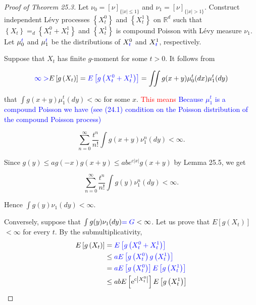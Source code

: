 \documentclass[a4paper,11pt]{article}
\begin{document}
\begin{proof}[Proof of Theorem 25.3]

    Let $\nu_{0}=[\nu]_{\{|x| \leq 1\}}$ and $\nu_{1}=[\nu]_{\{|x|>1\}}$. Construct
    independent Lévy processes $\left\{X_{t}^{0}\right\}$ and $\left\{X_{t}^{1}\right\}$ on $\mathbb{R}^{d}$ such
    that $\left\{X_{t}\right\} =_{d} \left\{X_{t}^{0}+ X_{t}^{1}\right\}$ and
    $\left\{X_{t}^{1}\right\}$ is compound Poisson with Lévy measure $\nu_{1}$. Let $\mu_{0}^{\textcolor{blue}{t}}$ and $\mu_{1}^{\textcolor{blue}{t}}$ be
    the distributions of $X_{\textcolor{blue}{t}}^{0}$ and $X_{\textcolor{blue}{t}}^{1}$, respectively.

    Suppose that $X_{t}$ has finite $g$-moment for some $t>0$. It follows from

    $$
        \textcolor{blue}{\infty>}E\left[g\left(X_{t}\right)\right]
        = \textcolor{blue}{ E\left[g\left(X^{0}_{t} + X^{1}_{t}\right)\right]}
        = \iint g(x+y) \mu_{0}^{t}(dx) \mu_{1}^{t}(dy)
    $$

    that $\int g(x+y) \mu_{1}^{t}(dy)<\infty$ for some $x$. \textcolor{red}{This means}  \textcolor{blue}{ Because $\mu_{1}^{t}$ is a compound Poisson we have (see (24.1) condition on the Poisson distribution of the compound Poisson process)}

    $$
        \sum_{n=0}^{\infty} \frac{t^{n}}{n !} \int g(x+y) \nu_{1}^{n}(dy)<\infty.
    $$

    Since $g(y) \leq a g(-x) g(x+y) \leq a b e^{c|x|} g(x+y)$ by Lemma 25.5, we get


    \begin{equation*}
        \sum_{n=0}^{\infty} \frac{t^{n}}{n !} \int g(y) \nu_{1}^{n}(dy)<\infty. \tag{25.4}
    \end{equation*}

    Hence $\int g(y) \nu_{1}(d y)<\infty$.

    Conversely, suppose that $\int g(y) \nu_{1}(dy) \textcolor{blue}{= G}<\infty$. Let us prove
    that $E\left[g\left(X_{t}\right)\right]$ $<\infty$ for every $t$. By the submultiplicativity,
    \begin{align*}
        E\left[g\left(X_{t}\right)\right] & =  \textcolor{blue}{E\left[g\left(X_{t}^{0} + X_{t}^{1}\right)\right]}                                    \\
                                          & \leq \textcolor{blue}{aE\left[ g\left(X_{t}^{0}\right) g\left(X_{t}^{1}\right)\right]}                    \\
                                          & = \textcolor{blue}{aE\left[ g\left(X_{t}^{0}\right)\right]  E\left[ g\left(X_{t}^{1}\right)\right]}       \\
                                          & \le a b E\left[\mathrm{e}^{\mathrm{c}\left|X_{t}^{0}\right|}\right] E\left[g\left(X_{t}^{1}\right)\right]
    \end{align*}


\end{proof}
\end{document}
